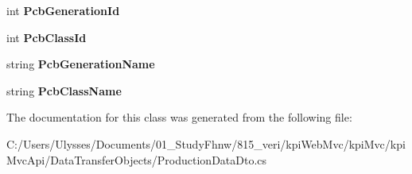 \begin{DoxyCompactItemize}
int {\bfseries Pcb\+Generation\+Id}
\item 
\mbox{\label{classkpi_mvc_api_1_1_data_transfer_objects_1_1_production_data_dto_a5f3110f6e0132a9e86e0aac45f624a2b}} 
int {\bfseries Pcb\+Class\+Id}
\item 
\mbox{\label{classkpi_mvc_api_1_1_data_transfer_objects_1_1_production_data_dto_ad77f639a55366cc0afda98890fe6fe01}} 
string {\bfseries Pcb\+Generation\+Name}
\item 
\mbox{\label{classkpi_mvc_api_1_1_data_transfer_objects_1_1_production_data_dto_a127f9fd37bef01ad74c1360377f505dd}} 
string {\bfseries Pcb\+Class\+Name}
\end{DoxyCompactItemize}


The documentation for this class was generated from the following file\+:\begin{DoxyCompactItemize}
\item 
C\+:/\+Users/\+Ulysses/\+Documents/01\+\_\+\+Study\+Fhnw/815\+\_\+veri/kpi\+Web\+Mvc/kpi\+Mvc/kpi\+Mvc\+Api/\+Data\+Transfer\+Objects/Production\+Data\+Dto.\+cs\end{DoxyCompactItemize}
